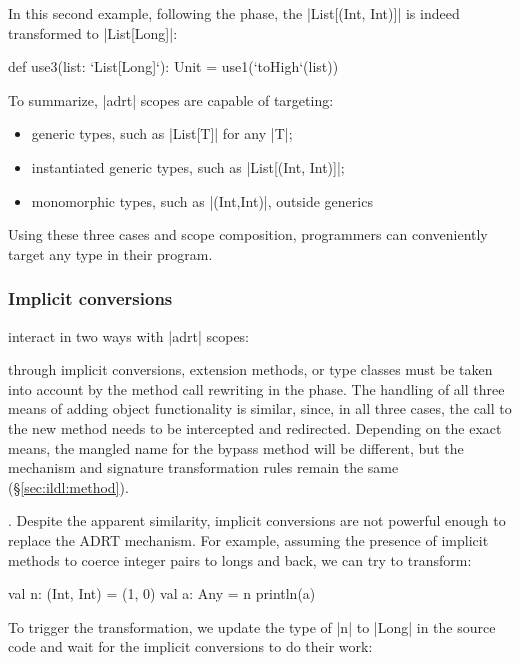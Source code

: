 In this second example, following the \commit{} phase, the |List[(Int, Int)]| is indeed transformed to |List[Long]|:

\begin{lstlisting-nobreak}
def use3(list: `List[Long]`): Unit = use1(`toHigh`(list))
\end{lstlisting-nobreak}

To summarize, |adrt| scopes are capable of targeting:


\begin{itemize}
\item generic types, such as |List[T]| for any |T|;
\item instantiated generic types, such as |List[(Int, Int)]|;
\item monomorphic types, such as |(Int,Int)|, outside generics
\end{itemize}


\noindent
Using these three cases and scope composition, programmers can conveniently target any type in their program.

\subsubsection*{Implicit conversions}
\label{sec:ildl:language-implicit-conversions}
interact in two ways with |adrt| scopes:


\noindent
{} through implicit conversions, extension methods, or type classes must be taken into account by the method call rewriting in the \coerce{} phase. The handling of all three means of adding object functionality is similar, since, in all three cases, the call to the new method needs to be intercepted and redirected. Depending on the exact means, the mangled name for the bypass method will be different, but the mechanism and signature transformation rules remain the same (\S\ref{sec:ildl:method}).


\noindent
{}. Despite the apparent similarity, implicit conversions are not powerful enough to replace the ADRT mechanism. For example, assuming the presence of implicit methods to coerce integer pairs to longs and back, we can try to transform:

\begin{lstlisting-nobreak}
val n: (Int, Int) = (1, 0)
val a: Any = n
println(a)
\end{lstlisting-nobreak}

\noindent
To trigger the transformation, we update the type of |n| to |Long| in the source code and wait for the implicit conversions to do their work:

